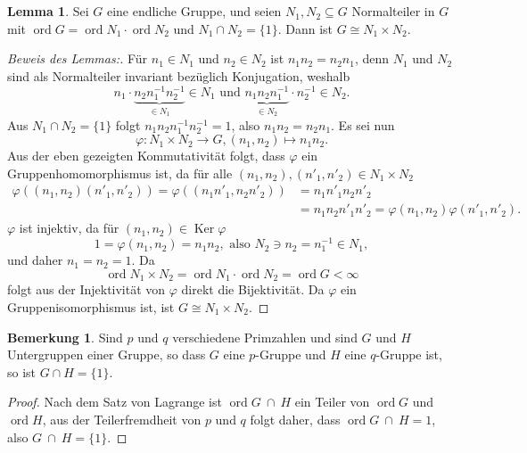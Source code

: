 \documentclass[a4paper,10pt]{article}
\theoremstyle{definition}
\newtheorem{bem}[beh]{Bemerkung}
\newtheorem{lem}[beh]{Lemma}
\newcommand{\ord}{\operatorname{ord}}
\newcommand{\Ker}{\operatorname{Ker}}
\begin{document}
\section{}
\begin{lem}\label{lem:normalprodukt}
 Sei $G$ eine endliche Gruppe, und seien $N_1, N_2 \subseteq G$ Normalteiler in $G$ mit $\ord G = \ord N_1 \cdot \ord N_2$ und $N_1 \cap N_2 = \{1\}$. Dann ist $G \cong N_1 \times N_2$.
\end{lem}
\begin{proof}[Beweis des Lemmas:]
 Für $n_1 \in N_1$ und $n_2 \in N_2$ ist $n_1 n_2 = n_2 n_1$, denn $N_1$ und $N_2$ sind als Normalteiler invariant bezüglich Konjugation, weshalb
 \[
  n_1 \cdot \underbrace{n_2 n_1^{-1} n_2^{-1}}_{\in N_1} \in N_1 \text{ und }
  \underbrace{n_1 n_2 n_1^{-1}}_{\in N_2} \cdot n_2^{-1} \in N_2.
 \]
 Aus $N_1 \cap N_2 = \{1\}$ folgt $n_1 n_2 n_1^{-1} n_2^{-1} = 1$, also $n_1 n_2 = n_2 n_1$. Es sei nun
 \[
  \varphi : N_1 \times N_2 \rightarrow G, (n_1, n_2) \mapsto n_1 n_2.
 \]
 Aus der eben gezeigten Kommutativität folgt, dass $\varphi$ ein Gruppenhomomorphismus ist, da für alle $(n_1,n_2), (n'_1, n'_2) \in N_1 \times N_2$
 \begin{align*}
  \varphi( (n_1,n_2) (n'_1, n'_2) )
  = \varphi( (n_1 n'_1, n_2 n'_2) )
  &= n_1 n'_1 n_2 n'_2 \\
  &= n_1 n_2 n'_1 n'_2
  = \varphi(n_1, n_2) \varphi(n'_1, n'_2).
 \end{align*}
 $\varphi$ ist injektiv, da für $(n_1, n_2) \in \Ker \varphi$
 \[
  1 = \varphi(n_1, n_2) = n_1 n_2, \text{ also } N_2 \ni n_2 = n_1^{-1} \in N_1,
 \]
und daher $n_1 = n_2 = 1$. Da
 \[
  \ord N_1 \times N_2 = \ord N_1 \cdot \ord N_2 = \ord G < \infty
 \]
 folgt aus der Injektivität von $\varphi$ direkt die Bijektivität. Da $\varphi$ ein Gruppenisomorphismus ist, ist $G \cong N_1 \times N_2$.
\end{proof}

\begin{bem}\label{bem:primschnitt}
 Sind $p$ und $q$ verschiedene Primzahlen und sind $G$ und $H$ Untergruppen einer Gruppe, so dass $G$ eine $p$-Gruppe und $H$ eine $q$-Gruppe ist, so ist $G \cap H = \{1\}$.
\end{bem}
\begin{proof}
 Nach dem Satz von Lagrange ist $\ord G\ \cap\ H$ ein Teiler von $\ord G$ und $\ord H$, aus der Teilerfremdheit von $p$ und $q$ folgt daher, dass $\ord G\ \cap\ H = 1$, also $G\ \cap\ H = \{1\}$.
\end{proof}
\end{document}
